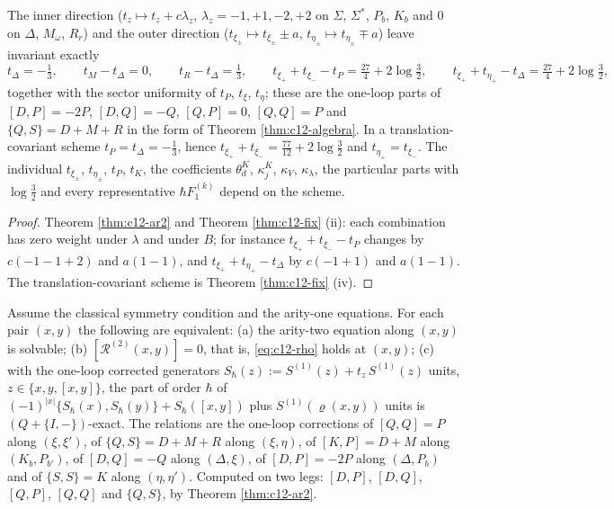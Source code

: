 \begin{corollary}
\label{cor:c12-inv}
The inner direction ($t_z\mapsto t_z+c\lambda_z$, $\lambda_z=-1,+1,-2,+2$ on $\Sigma$, $\Sigma^*$, $P_b$, $K_b$ and $0$ on $\Delta$, $M_\omega$, $R_r$) and the outer direction ($t_{\xi_\pm}\mapsto t_{\xi_\pm}\pm a$, $t_{\eta_\pm}\mapsto t_{\eta_\pm}\mp a$) leave invariant exactly
\[
t_\Delta=-\tfrac13,\qquad t_M-t_\Delta=0,\qquad t_R-t_\Delta=\tfrac13,\qquad t_{\xi_+}+t_{\xi_-}-t_P=\tfrac{27}4+2\log\tfrac32,\qquad t_{\xi_+}+t_{\eta_+}-t_\Delta=\tfrac{27}4+2\log\tfrac32,
\]
together with the sector uniformity of $t_P$, $t_\xi$, $t_\eta$; these are the one-loop parts of $[D,P]=-2P$, $[D,Q]=-Q$, $[Q,P]=0$, $[Q,Q]=P$ and $\{Q,S\}=D+M+R$ in the form of Theorem \ref{thm:c12-algebra}. In a translation-covariant scheme $t_P=t_\Delta=-\tfrac13$, hence $t_{\xi_+}+t_{\xi_-}=\tfrac{77}{12}+2\log\tfrac32$ and $t_{\eta_+}=t_{\xi_-}$. The individual $t_{\xi_\pm}$, $t_{\eta_\pm}$, $t_P$, $t_K$, the coefficients $\theta^K_d$, $\kappa^K_j$, $\kappa_V$, $\kappa_\lambda$, the particular parts with $\log\tfrac32$ and every representative $\hbar F_1^{(k)}$ depend on the scheme.
\end{corollary}

\begin{proof}
Theorem \ref{thm:c12-ar2} and Theorem \ref{thm:c12-fix} (ii): each combination has zero weight under $\lambda$ and under $B$; for instance $t_{\xi_+}+t_{\xi_-}-t_P$ changes by $c(-1-1+2)$ and $a(1-1)$, and $t_{\xi_+}+t_{\eta_+}-t_\Delta$ by $c(-1+1)$ and $a(1-1)$. The translation-covariant scheme is Theorem \ref{thm:c12-fix} (iv).
\end{proof}

\begin{theorem}
\label{thm:c12-algebra}
Assume the classical symmetry condition and the arity-one equations. For each pair $(x,y)$ the following are equivalent: (a) the arity-two equation along $(x,y)$ is solvable; (b) $[\mathcal R^{(2)}(x,y)]=0$, that is, \eqref{eq:c12-rho} holds at $(x,y)$; (c) with the one-loop corrected generators $S_\hbar(z):=S^{(1)}(z)+t_z\,S^{(1)}(z)$ units, $z\in\{x,y,[x,y]\}$, the part of order $\hbar$ of $(-1)^{|x|}\{S_\hbar(x),S_\hbar(y)\}+S_\hbar([x,y])$ plus $S^{(1)}(\varrho(x,y))$ units is $(Q+\{I,-\})$-exact. The relations are the one-loop corrections of $[Q,Q]=P$ along $(\xi,\xi')$, of $\{Q,S\}=D+M+R$ along $(\xi,\eta)$, of $[K,P]=D+M$ along $(K_b,P_{b'})$, of $[D,Q]=-Q$ along $(\Delta,\xi)$, of $[D,P]=-2P$ along $(\Delta,P_b)$ and of $\{S,S\}=K$ along $(\eta,\eta')$. Computed on two legs: $[D,P]$, $[D,Q]$, $[Q,P]$, $[Q,Q]$ and $\{Q,S\}$, by Theorem \ref{thm:c12-ar2}.
\end{theorem}

